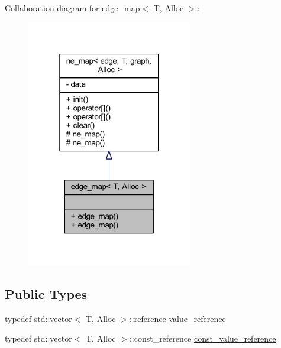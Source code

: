 Collaboration diagram for edge\+\_\+map$<$ T, Alloc $>$\+:\nopagebreak
\begin{figure}[H]
\begin{center}
\leavevmode
\includegraphics[width=205pt]{classedge__map__coll__graph}
\end{center}
\end{figure}
\subsection*{Public Types}
\begin{DoxyCompactItemize}
\item 
typedef std\+::vector$<$ T, Alloc $>$\+::reference \mbox{\hyperlink{classne__map_a3de60750d102f8992a215b0fe645014d}{value\+\_\+reference}}
\item 
typedef std\+::vector$<$ T, Alloc $>$\+::const\+\_\+reference \mbox{\hyperlink{classne__map_ad2be1a01de53940aee1282ec0e34f0f7}{const\+\_\+value\+\_\+reference}}
\end{DoxyCompactItemize}
